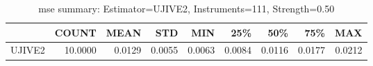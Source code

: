 \begin{table}[ht]
\centering
\caption{mse summary: Estimator=UJIVE2, Instruments=111, Strength=0.50}
\begin{tabular}{lrrrrrrrr}
\toprule
 & COUNT & MEAN & STD & MIN & 25\% & 50\% & 75\% & MAX \\
\midrule
UJIVE2 & 10.0000 & 0.0129 & 0.0055 & 0.0063 & 0.0084 & 0.0116 & 0.0177 & 0.0212 \\
\bottomrule
\end{tabular}
\end{table}
